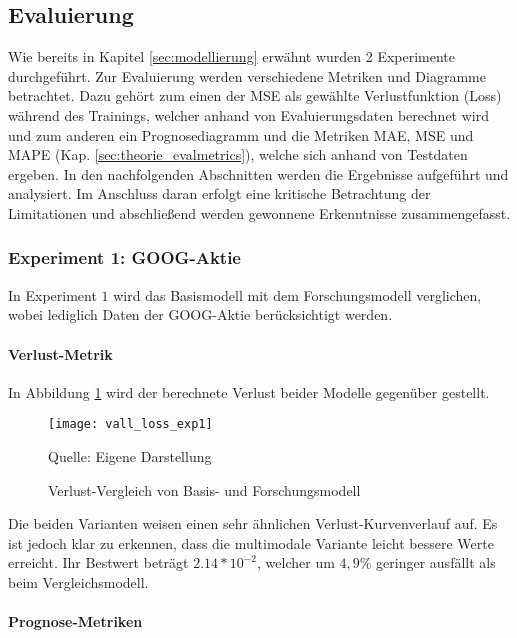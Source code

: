 \newpage
\subsection{Evaluierung}\label{sec:evaluierung}

Wie bereits in Kapitel \ref{sec:modellierung} erwähnt wurden 2 Experimente durchgeführt. Zur Evaluierung werden verschiedene Metriken und Diagramme betrachtet. Dazu gehört zum einen der \ac{MSE} als gewählte Verlustfunktion (Loss) während des Trainings, welcher anhand von Evaluierungsdaten berechnet wird und zum anderen ein Prognosediagramm und die Metriken \ac{MAE}, \ac{MSE} und \ac{MAPE} (Kap. \ref{sec:theorie_evalmetrics}), welche sich anhand von Testdaten ergeben.
In den nachfolgenden Abschnitten werden die Ergebnisse aufgeführt und analysiert. Im Anschluss daran erfolgt eine kritische Betrachtung der Limitationen und abschließend werden gewonnene Erkenntnisse zusammengefasst. 

\subsubsection{Experiment 1: GOOG-Aktie}\label{sec:evaluierung_exp1}
In Experiment $1$ wird das Basismodell mit dem Forschungsmodell verglichen, wobei lediglich Daten der GOOG-Aktie berücksichtigt werden. 

\paragraph*{Verlust-Metrik} 

In Abbildung \ref{fig:vall_loss_exp1} wird der berechnete Verlust beider Modelle gegenüber gestellt.
\begin{figure}[H]
	\caption{Verlust-Vergleich von Basis- und Forschungsmodell}
	\texttt{[image: vall\_loss\_exp1]}
	\label{fig:vall_loss_exp1}
	\raggedright
	\normalsize{Quelle: Eigene Darstellung}
	\vspace{-1.0em}
\end{figure}
Die beiden Varianten weisen einen sehr ähnlichen Verlust-Kurvenverlauf auf. Es ist jedoch klar zu erkennen, dass die multimodale Variante leicht bessere Werte erreicht. Ihr Bestwert beträgt $2.14*10^{-2}$, welcher um $4,9\%$ geringer ausfällt als beim Vergleichsmodell.

\paragraph*{Prognose-Metriken} 

